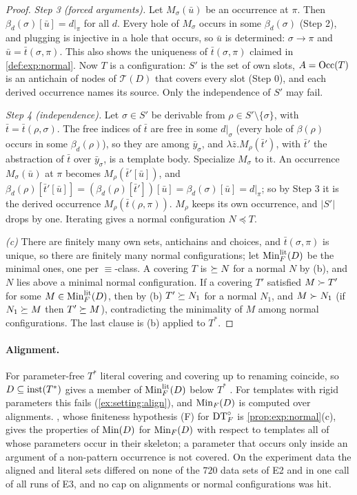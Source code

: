 \begin{proof}
\emph{Step 3 (forced arguments).} Let $M_\sigma(\bar u)$ be an occurrence at $\pi$. Then $\beta_d(\sigma)[\bar u]=d|_\pi$ for all $d$. Every hole of $M_\sigma$ occurs in some $\beta_d(\sigma)$ (Step 2), and plugging is injective in a hole that occurs, so $\bar u$ is determined: $\sigma\to\pi$ and $\bar u=\bar t(\sigma,\pi)$. This also shows the uniqueness of $\bar t(\sigma,\pi)$ claimed in \cref{def:exp:normal}. Now $T$ is a configuration: $S'$ is the set of own slots, $A=\mathrm{Occ}(T)$ is an antichain of nodes of $\mathcal T(D)$ that covers every slot (Step 0), and each derived occurrence names its source. Only the independence of $S'$ may fail.

\emph{Step 4 (independence).} Let $\sigma\in S'$ be derivable from $\rho\in S'\setminus\{\sigma\}$, with $\bar t=\bar t(\rho,\sigma)$. The free indices of $\bar t$ are free in some $d|_\sigma$ (every hole of $\beta(\rho)$ occurs in some $\beta_d(\rho)$), so they are among $\bar y_\sigma$, and $\lambda\bar z.M_\rho(\bar t')$, with $\bar t'$ the abstraction of $\bar t$ over $\bar y_\sigma$, is a template body. Specialize $M_\sigma$ to it. An occurrence $M_\sigma(\bar u)$ at $\pi$ becomes $M_\rho(\bar t'[\bar u])$, and $\beta_d(\rho)[\bar t'[\bar u]]=(\beta_d(\rho)[\bar t'])[\bar u]=\beta_d(\sigma)[\bar u]=d|_\pi$; so by Step 3 it is the derived occurrence $M_\rho(\bar t(\rho,\pi))$. $M_\rho$ keeps its own occurrence, and $|S'|$ drops by one. Iterating gives a normal configuration $N\preceq T$.

\emph{(c)} There are finitely many own sets, antichains and choices, and $\bar t(\sigma,\pi)$ is unique, so there are finitely many normal configurations; let $\mathrm{Min}^{\mathrm{lit}}_F(D)$ be the minimal ones, one per $\equiv$-class. A covering $T$ is $\succeq N$ for a normal $N$ by (b), and $N$ lies above a minimal normal configuration. If a covering $T'$ satisfied $M\succ T'$ for some $M\in\mathrm{Min}^{\mathrm{lit}}_F(D)$, then by (b) $T'\succeq N_1$ for a normal $N_1$, and $M\succ N_1$ (if $N_1\succeq M$ then $T'\succeq M$), contradicting the minimality of $M$ among normal configurations. The last clause is (b) applied to $T^*$.
\end{proof}

\paragraph{Alignment.}
For parameter-free $T^*$ literal covering and covering up to renaming coincide, so $D\subseteq\mathrm{inst}(T^*)$ gives a member of $\mathrm{Min}^{\mathrm{lit}}_F(D)$ below $T^*$ . For templates with rigid parameters this fails (\cref{ex:setting:align}), and $\mathrm{Min}_F(D)$ is computed over alignments. , whose finiteness hypothesis (F) for $\mathrm{DT}^{\circ}_{F}$ is \cref{prop:exp:normal}(c), gives the properties of $\mathrm{Min}(D)$ for $\mathrm{Min}_F(D)$ with respect to templates all of whose parameters occur in their skeleton; a parameter that occurs only inside an argument of a non-pattern occurrence is not covered. On the experiment data the aligned and literal sets differed on none of the $720$ data sets of E2 and in one call of all \DTRC{} runs of E3, and no cap on alignments or normal configurations was hit.

